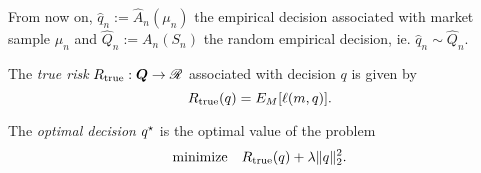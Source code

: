 \documentclass[11pt]{article}
\begin{document}
From now on, $\hat q_n := \hat A_n(\mu_n)$ the empirical decision associated with market sample
$\mu_n$ and $\hat Q_n := A_n(S_n)$ the random empirical decision, ie. $\hat q_n \sim \hat Q_n$.

\begin{deff}
  The \textsl{true risk} $R_{\mathrm{true}}:\bm Q\to\mathscr{R}$ associated with decision $q$ is given by
  \begin{equation*}
    R_{\mathrm{true}}(q) = E_M[\ell(m,q)].
  \end{equation*}
\end{deff}

\begin{deff}
  The \textsl{optimal decision} ${q^\star}$ is the optimal value of the problem
  \begin{equation*}
    \text{minimize}\quad R_{\mathrm{true}}(q) + \lambda\|q\|_2^2.
  \end{equation*}
\end{deff}
\end{document}
